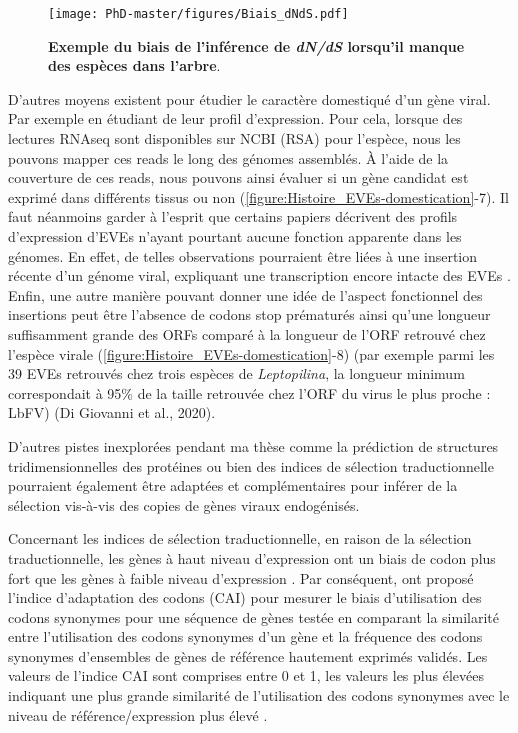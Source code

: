 \begin{figure}[!htpb]
\captionsetup{font=footnotesize}
 \centering
  \texttt{[image: PhD-master/figures/Biais\_dNdS.pdf]}
\caption[Methode:Exemple du biais de l'inférence de \textit{dN/dS} lorsqu'il manque des espèces dans l'arbre]{\textbf{Exemple du biais de l'inférence de \textit{dN/dS} lorsqu'il manque des espèces dans l'arbre}.}
\label{figure:Biais_dNdS}
\end{figure}

D'autres moyens existent pour étudier le caractère domestiqué d'un gène viral. Par exemple en étudiant de leur profil d'expression. Pour cela, lorsque des lectures RNAseq sont disponibles sur NCBI (RSA) pour l'espèce, nous les pouvons mapper ces reads le long des génomes assemblés. À l'aide de la couverture de ces reads, nous pouvons ainsi évaluer si un gène candidat est exprimé dans différents tissus ou non (\figurename{\ref{figure:Histoire_EVEs-domestication}}-7). Il faut néanmoins garder à l'esprit que certains papiers décrivent des profils d'expression d'EVEs n'ayant pourtant aucune fonction apparente dans les génomes. En effet, de telles observations pourraient être liées à une insertion récente d'un génome viral, expliquant une transcription encore intacte des EVEs \citep{cheng_brown_2014}. Enfin, une autre manière pouvant donner une idée de l'aspect fonctionnel des insertions peut être l'absence de codons stop prématurés ainsi qu'une longueur suffisamment grande des ORFs comparé à la longueur de l'ORF retrouvé chez l'espèce virale (\figurename{\ref{figure:Histoire_EVEs-domestication}}-8) (par exemple parmi les 39 EVEs retrouvés chez trois espèces de \textit{Leptopilina}, la longueur minimum correspondait à 95\% de la taille retrouvée chez l'ORF du virus le plus proche : LbFV) (Di Giovanni et al., 2020).

D'autres pistes inexplorées pendant ma thèse comme la prédiction de structures tridimensionnelles des protéines ou bien des indices de sélection traductionnelle pourraient également être adaptées et complémentaires pour inférer de la sélection vis-à-vis des copies de gènes viraux endogénisés.

Concernant les indices de sélection traductionnelle, en raison de la sélection traductionnelle, les gènes à haut niveau d'expression ont un biais de codon plus fort que les gènes à faible niveau d'expression \citep{hiraoka_codon_2009,zhou_non-optimal_2013}. Par conséquent, \cite{sharp_codon_1987} ont proposé l'indice d'adaptation des codons (CAI) pour mesurer le biais d'utilisation des codons synonymes pour une séquence de gènes testée en comparant la similarité entre l'utilisation des codons synonymes d'un gène et la fréquence des codons synonymes d'ensembles de gènes de référence hautement exprimés validés. Les valeurs de l'indice CAI sont comprises entre 0 et 1, les valeurs les plus élevées indiquant une plus grande similarité de l'utilisation des codons synonymes avec le niveau de référence/expression plus élevé \citep{puigbo_caical_2008}. 

